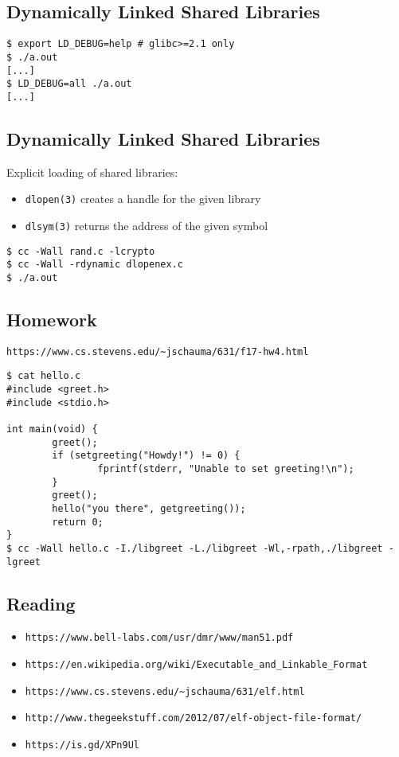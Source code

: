 \documentclass[xga]{xdvislides}
\begin{document}
\subsection{Dynamically Linked Shared Libraries}
\begin{verbatim}
$ export LD_DEBUG=help # glibc>=2.1 only
$ ./a.out
[...]
$ LD_DEBUG=all ./a.out
[...]
\end{verbatim}

\subsection{Dynamically Linked Shared Libraries}
Explicit loading of shared libraries:
\begin{itemize}
	\item {\tt dlopen(3)} creates a handle for the given library
	\item {\tt dlsym(3)} returns the address of the given symbol
\end{itemize}

\begin{verbatim}
$ cc -Wall rand.c -lcrypto
$ cc -Wall -rdynamic dlopenex.c
$ ./a.out
\end{verbatim}

\subsection{Homework}
\verb+https://www.cs.stevens.edu/~jschauma/631/f17-hw4.html+ \\

\begin{verbatim}
$ cat hello.c
#include <greet.h>
#include <stdio.h>

int main(void) {
        greet();
        if (setgreeting("Howdy!") != 0) {
                fprintf(stderr, "Unable to set greeting!\n");
        }
        greet();
        hello("you there", getgreeting());
        return 0;
}
$ cc -Wall hello.c -I./libgreet -L./libgreet -Wl,-rpath,./libgreet -lgreet
\end{verbatim}

\subsection{Reading}
\begin{itemize}
	\item \verb+https://www.bell-labs.com/usr/dmr/www/man51.pdf+
	\item \verb+https://en.wikipedia.org/wiki/Executable_and_Linkable_Format+
	\item \verb+https://www.cs.stevens.edu/~jschauma/631/elf.html+
	\item \verb+http://www.thegeekstuff.com/2012/07/elf-object-file-format/+
	\item \verb+https://is.gd/XPn9Ul+
\end{itemize}
\end{document}

